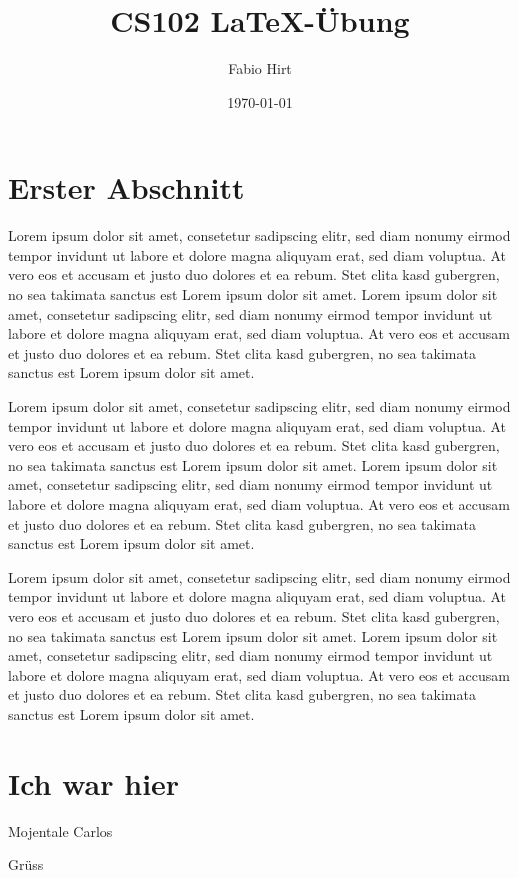 \documentclass[11pt]{article}
\date{\today}
\author{Fabio Hirt}
\title{CS102 \LaTeX -Übung}
\begin{document}
\maketitle

\section{Erster Abschnitt}
Lorem ipsum dolor sit amet, consetetur sadipscing elitr, sed diam nonumy eirmod tempor invidunt ut labore et dolore magna aliquyam erat, sed diam voluptua. At vero eos et accusam et justo duo dolores et ea rebum. Stet clita kasd gubergren, no sea takimata sanctus est Lorem ipsum dolor sit amet. Lorem ipsum dolor sit amet, consetetur sadipscing elitr, sed diam nonumy eirmod tempor invidunt ut labore et dolore magna aliquyam erat, sed diam voluptua. At vero eos et accusam et justo duo dolores et ea rebum. Stet clita kasd gubergren, no sea takimata sanctus est Lorem ipsum dolor sit amet.

Lorem ipsum dolor sit amet, consetetur sadipscing elitr, sed diam nonumy eirmod tempor invidunt ut labore et dolore magna aliquyam erat, sed diam voluptua. At vero eos et accusam et justo duo dolores et ea rebum. Stet clita kasd gubergren, no sea takimata sanctus est Lorem ipsum dolor sit amet. Lorem ipsum dolor sit amet, consetetur sadipscing elitr, sed diam nonumy eirmod tempor invidunt ut labore et dolore magna aliquyam erat, sed diam voluptua. At vero eos et accusam et justo duo dolores et ea rebum. Stet clita kasd gubergren, no sea takimata sanctus est Lorem ipsum dolor sit amet.

Lorem ipsum dolor sit amet, consetetur sadipscing elitr, sed diam nonumy eirmod tempor invidunt ut labore et dolore magna aliquyam erat, sed diam voluptua. At vero eos et accusam et justo duo dolores et ea rebum. Stet clita kasd gubergren, no sea takimata sanctus est Lorem ipsum dolor sit amet. Lorem ipsum dolor sit amet, consetetur sadipscing elitr, sed diam nonumy eirmod tempor invidunt ut labore et dolore magna aliquyam erat, sed diam voluptua. At vero eos et accusam et justo duo dolores et ea rebum. Stet clita kasd gubergren, no sea takimata sanctus est Lorem ipsum dolor sit amet.

\section{Ich war hier}
Mojentale Carlos

Grüss

\pagebreak
\end{document}

